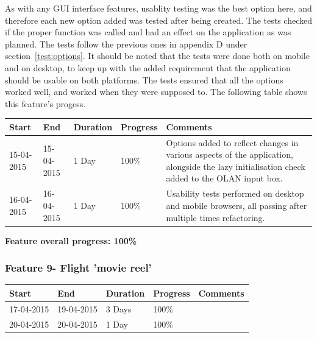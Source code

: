 As with any GUI interface features, usablity testing was the best option here, and therefore each new option added was tested after being created. The tests checked if the proper function was called and had an effect on the application as was planned. The tests follow the previous ones in appendix D under section~\ref{test:options}. It should be noted that the tests were done both on mobile and on desktop, to keep up with the added requirement that the application should be usable on both platforms. The tests ensured that all the options worked well, and worked when they were supposed to. The following table shows this feature's progess.

\begin{table}[h]
\begin{tabular}{|l|l|l|l|p{7cm}|}
\hline
\textbf{Start} & \textbf{End} & \textbf{Duration} & \textbf{Progress} & \textbf{Comments}                                                                                                     \\ \hline
15-04-2015     & 15-04-2015   & 1 Day            & 100\%             &  Options added to reflect changes in various aspects of the application, alongside the lazy initialisation check added to the OLAN input box.\\ \hline
16-04-2015     & 16-04-2015   & 1 Day            & 100\%             &  Usability tests performed on desktop and mobile browsers, all passing after multiple times refactoring. \\ \hline
\end{tabular}
\end{table}

\textbf{Feature overall progress: 100\%}

\subsubsection{Feature 9- Flight 'movie reel'}

\begin{table}[h]
\begin{tabular}{|l|l|l|l|p{7cm}|}
\hline
\textbf{Start} & \textbf{End} & \textbf{Duration} & \textbf{Progress} & \textbf{Comments}                                                                                                     \\ \hline
17-04-2015     & 19-04-2015   & 3 Days            & 100\%             &  \\ \hline
20-04-2015     & 20-04-2015   & 1 Day            & 100\%             &  \\ \hline
\end{tabular}
\end{table}


